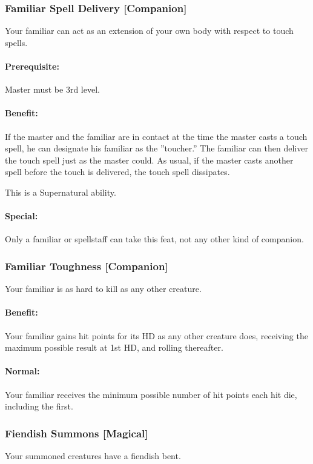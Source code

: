 \subsubsection[Familiar Spell Delivery]{Familiar Spell Delivery [Companion]}
\label{Feat:FamiliarSpellDelivery}
Your familiar can act as an extension of your own body with respect to touch spells.

\paragraph{Prerequisite:} Master must be 3rd level.

\paragraph{Benefit:} If the master and the familiar are in contact at the time the master casts a touch spell, he can designate his familiar as the ''toucher.'' 
The familiar can then deliver the touch spell just as the master could. 
As usual, if the master casts another spell before the touch is delivered, the touch spell dissipates. 

This is a Supernatural ability.

\paragraph{Special:} Only a familiar or spellstaff can take this feat, not any other kind of companion.
\subsubsection[Familiar Toughness]{Familiar Toughness [Companion]}
\label{Feat:FamiliarToughness}
Your familiar is as hard to kill as any other creature.

\paragraph{Benefit:} Your familiar gains hit points for its HD as any other creature does, receiving the maximum possible result at 1st HD, and rolling thereafter.

\paragraph{Normal:} Your familiar receives the minimum possible number of hit points each hit die, including the first.
\subsubsection[Fiendish Summons]{Fiendish Summons [Magical]}
\label{Feat:FiendishSummons}
Your summoned creatures have a fiendish bent.

